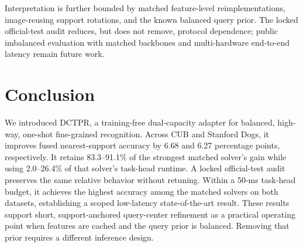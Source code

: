 \documentclass[]{spie}
\newcommand{\method}{\textsc{DCTPR}\xspace}
\begin{document}
Interpretation is further bounded by matched feature-level reimplementations,
image-reusing support rotations, and the known balanced query prior. The locked
official-test audit reduces, but does not remove, protocol dependence; public
imbalanced evaluation with matched backbones and multi-hardware end-to-end
latency remain future work.

\section{Conclusion}
\label{sec:conclusion}

We introduced \method, a training-free dual-capacity adapter for balanced,
high-way, one-shot fine-grained recognition. Across CUB and Stanford Dogs, it
improves fused nearest-support accuracy by 6.68 and 6.27 percentage points,
respectively. It retains 83.3--91.1\% of the strongest matched solver's gain
while using 2.0--26.4\% of that solver's task-head runtime. A locked
official-test audit preserves the same relative behavior without retuning.
Within a 50-ms task-head budget, it achieves the highest accuracy among the
matched solvers on both datasets, establishing a scoped low-latency
state-of-the-art result. These results support short, support-anchored
query-center refinement as a practical operating point when features are cached
and the query prior is balanced. Removing that prior requires a different
inference design.



\end{document}

